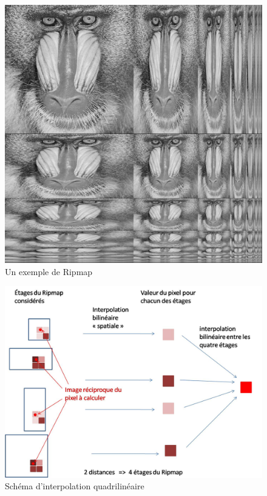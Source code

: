 \begin{figure}[h!]
\centering
\caption{Un exemple de Ripmap}
\includegraphics[scale=0.4]{Ripmap_real}
\end{figure}


\begin{figure}[h!]
\centering
\caption{Schéma d'interpolation quadrilinéaire}
\includegraphics[scale=0.5]{interbibilineaire.jpg}
\end{figure}


